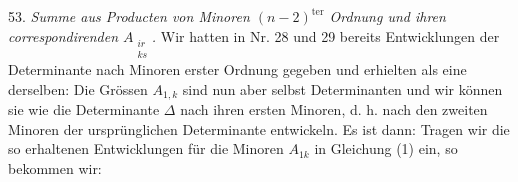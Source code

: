 53. \textit{Summe aus Producten von Minoren $(n-2)^{\text{ter}}$ Ordnung und ihren correspondirenden $A_{\substack{ir \\ ks}}$.} Wir hatten in Nr. 28 und 29 bereits Entwicklungen der Determinante nach Minoren erster Ordnung gegeben und erhielten als eine derselben:
Die Grössen $A_{1,k}$ sind nun aber selbst Determinanten und wir können sie wie die Determinante $\Delta$ nach ihren ersten Minoren, d. h. nach den zweiten Minoren der ursprünglichen Determinante entwickeln. Es ist dann:
Tragen wir die so erhaltenen Entwicklungen für die Minoren $A_{1k}$ in Gleichung (1) ein, so bekommen wir:


